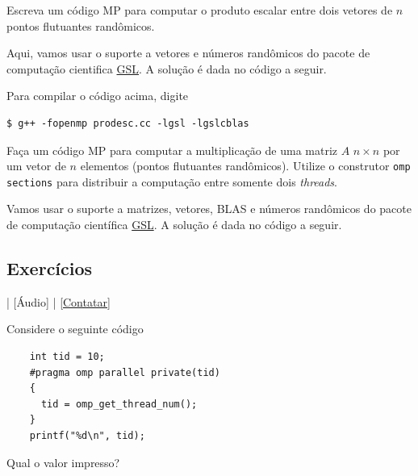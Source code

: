 \begin{exeresol}\label{exeresol:produto_escalar}
  Escreva um código MP para computar o produto escalar entre dois vetores de $n$ pontos flutuantes randômicos.
\end{exeresol}
\begin{resol}
  Aqui, vamos usar o suporte a vetores e números randômicos do pacote de computação cientifica \href{https://www.gnu.org/software/gsl/}{GSL}. A solução é dada no código a seguir.

  

  Para compilar o código acima, digite
\begin{verbatim}
$ g++ -fopenmp prodesc.cc -lgsl -lgslcblas
\end{verbatim}
\end{resol}

\begin{exeresol}\label{exeresol:cc_AxSecoes}
  Faça um código MP para computar a multiplicação de uma matriz $A$ $n\times n$ por um vetor de $n$ elementos (pontos flutuantes randômicos). Utilize o construtor \verb+omp sections+ para distribuir a computação entre somente dois {\it threads}.
\end{exeresol}
\begin{resol}
  Vamos usar o suporte a matrizes, vetores, BLAS e números randômicos do pacote de computação científica \href{https://www.gnu.org/software/gsl/}{GSL}. A solução é dada no código a seguir.

  
\end{resol}

\subsection*{Exercícios}

\begin{flushright}
  [Vídeo] | [Áudio] | \href{https://phkonzen.github.io/notas/contato.html}{[Contatar]}
\end{flushright}

\begin{exer}
  Considere o seguinte código
  \begin{lstlisting}
    int tid = 10;
    #pragma omp parallel private(tid)
    {
      tid = omp_get_thread_num();
    }
    printf("%d\n", tid);
  \end{lstlisting}
  Qual o valor impresso?
\end{exer}

